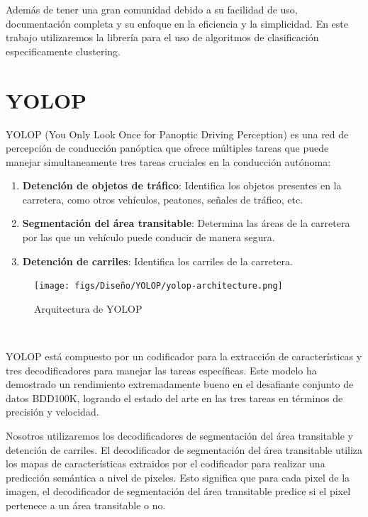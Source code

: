Además de tener una gran comunidad debido a su facilidad de uso, documentación completa y su enfoque en la eficiencia y la simplicidad. En este trabajo utilizaremos la librería para el uso
de algoritmos de clasificación especificamente clustering. 


\section{YOLOP}
\label{sec:YOLOP}
YOLOP \cite{YOLOP} (You Only Look Once for Panoptic Driving Perception) es una red de percepción
de conducción panóptica que ofrece múltiples tareas que puede
manejar simultaneamente tres tareas cruciales en la conducción autónoma: 
\begin{enumerate}
  \item \textbf{Detención de objetos de tráfico}: Identifica los objetos presentes en la carretera, como otros vehículos, peatones, señales de tráfico, etc.
  \item \textbf{Segmentación del área transitable}: Determina las áreas de la carretera por las que un vehículo puede conducir de manera segura.
  \item \textbf{Detención de carriles}: Identifica los carriles de la carretera.
\end{enumerate}

\begin{figure} [H]
  \begin{center}
    \texttt{[image: figs/Diseño/YOLOP/yolop-architecture.png]}
  \end{center}
  \caption{Arquitectura de YOLOP}
  \label{fig:Arq_YOLOP}
\end{figure}\

YOLOP está compuesto por un codificador para la extracción de características y tres decodificadores para manejar las tareas específicas. Este modelo ha demostrado un rendimiento 
extremadamente bueno en el desafiante conjunto de datos BDD100K\cite{BDD100K}, logrando el estado del arte en las tres tareas en términos de precisión y velocidad. \newline

Nosotros utilizaremos los decodificadores de segmentación del área transitable 
y detención de carriles. El decodificador de segmentación del área transitable utiliza los mapas de características
extraidos por el codificador para realizar una predicción semántica a nivel de pixeles. Esto significa que 
para cada pixel de la imagen, el decodificador de segmentación del área transitable predice si el pixel 
pertenece a un área transitable o no. \newline

